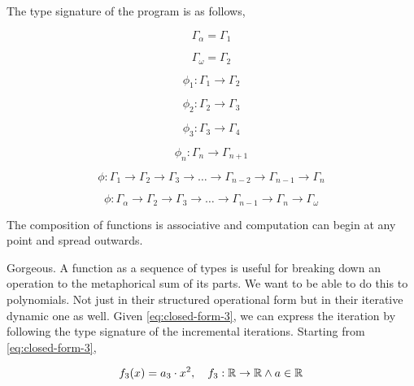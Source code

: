The type signature of the program is as follows,

\begin{equation}
    \Gamma_\alpha = \Gamma_1
\end{equation}

\begin{equation}
    \Gamma_\omega = \Gamma_2
\end{equation}

\begin{equation}
    \phi_1: \Gamma_1 \rightarrow \Gamma_2
\end{equation}

\begin{equation}
    \phi_2: \Gamma_2 \rightarrow \Gamma_3
\end{equation}

\begin{equation}
    \phi_3: \Gamma_3 \rightarrow \Gamma_4
\end{equation}

\begin{equation}
    \phi_n: \Gamma_n \rightarrow \Gamma_{n+1}
\end{equation}

\begin{equation}
    \phi: \Gamma_1 \rightarrow \Gamma_2 \rightarrow \Gamma_3 \rightarrow \dots \rightarrow \Gamma_{n-2} \rightarrow \Gamma_{n-1} \rightarrow \Gamma_n
\end{equation}

\begin{equation}
    \phi: \Gamma_\alpha \rightarrow \Gamma_2 \rightarrow \Gamma_3 \rightarrow \dots \rightarrow \Gamma_{n-1} \rightarrow \Gamma_n \rightarrow \Gamma_\omega
\end{equation}

The composition of functions is associative and computation can begin at any
point and spread outwards.

Gorgeous. A function as a sequence of types is useful for breaking down an
operation to the metaphorical sum of its parts. We want to be able to do this
to polynomials. Not just in their structured operational form but in their
iterative dynamic one as well. Given \ref{eq:closed-form-3}, we can express the
iteration by following the type signature of the incremental iterations.
Starting from \ref{eq:closed-form-3},

\begin{equation}
    f_3(x) = a_3 \cdot x^2, \quad f_3: \mathbb{R} \rightarrow \mathbb{R} \land a \in \mathbb{R} \notag
\end{equation}

